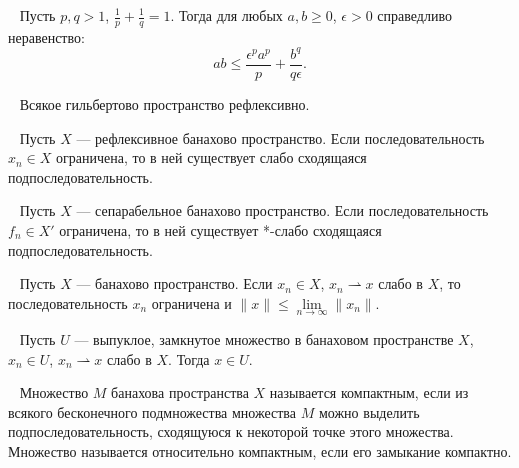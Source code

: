\begin{lemma}
    \label{lemma:young}~\cite[с.~38]{Zeidler1990a}
    Пусть $p, q > 1$, $\frac{1}{p} + \frac{1}{q} = 1$.
    Тогда для любых $a, b \ge 0$, $\epsilon > 0$
    справедливо неравенство:
    \[
        ab \le \frac{\epsilon^p a^p}{p} + \frac{b^q}{q\epsilon}.
    \]
\end{lemma}

\begin{lemma}
    \label{lemma:reflexive}~\cite[с.~254]{Zeidler1990a}
    Всякое гильбертово пространство рефлексивно.
\end{lemma}

\begin{lemma}
    \label{lemma:reflexive_weak}~\cite[с.~255]{Zeidler1990a}
    Пусть $X$ — рефлексивное банахово пространство.
    Если последовательность $x_n \in X$ ограничена,
    то в ней существует слабо сходящаяся подпоследовательность.
\end{lemma}

\begin{lemma}
    \label{lemma:separable_star_weak}~\cite[260]{Zeidler1990a}
    Пусть $X$ — сепарабельное банахово пространство.
    Если последовательность $f_n \in X'$ ограничена,
    то в ней существует *-слабо сходящаяся подпоследовательность.
\end{lemma}

\begin{lemma}
    \label{lemma:weak_limit}~\cite[258]{Zeidler1990a}
    Пусть $X$ — банахово пространство.
    Если $x_n \in X$, $x_n \rightharpoonup x$ слабо в $X$,
    то последовательность $x_n$ ограничена и
    $\|x\| \le \lim\limits_{n \to \infty} \|x_n\|$.
\end{lemma}

\begin{lemma}
    \label{lemma:convex_closed}~\cite[47]{Troeltzsch2010}
    Пусть $U$ — выпуклое, замкнутое множество в банаховом пространстве
    $X$, $x_n \in U$, $x_n \rightharpoonup x$ слабо в $X$.
    Тогда $x \in U$.
\end{lemma}

\begin{definition}
    \label{def:compact_set}~\cite[с.~48]{Lusternik1982}
    Множество $M$ банахова пространства $X$ называется компактным,
    если из всякого бесконечного подмножества множества $M$ можно
    выделить подпоследовательность,
    сходящуюся к некоторой точке этого множества.
    Множество называется относительно компактным,
    если его замыкание компактно.
\end{definition}

